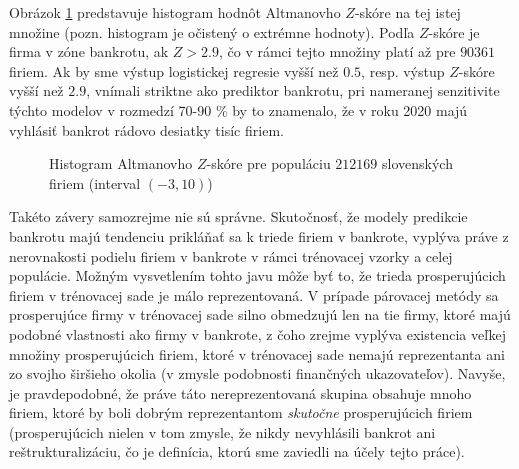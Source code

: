 Obrázok \ref{altman_whole_pop} predstavuje histogram hodnôt Altmanovho \(Z\)-skóre na tej istej množine (pozn. histogram je očistený o extrémne hodnoty).
Podľa \(Z\)-skóre je firma v zóne bankrotu, ak \(Z > 2.9\), čo v rámci tejto množiny platí až pre \(90361\) firiem.
Ak by sme výstup logistickej regresie vyšší než \(0.5\), resp. výstup \(Z\)-skóre vyšší než \(2.9\), vnímali striktne ako prediktor bankrotu,
pri nameranej senzitivite týchto modelov v rozmedzí 70-90 \% by to znamenalo, že v roku 2020 majú vyhlásiť bankrot rádovo desiatky tisíc firiem.

\begin{figure}
\caption{Histogram Altmanovho \(Z\)-skóre pre populáciu \(212169\) slovenských firiem (interval \((-3, 10)\))}
\label{altman_whole_pop}
\end{figure}

Takéto závery samozrejme nie sú správne. Skutočnosť, že modely predikcie bankrotu majú tendenciu prikláňať sa k triede firiem v bankrote,
vyplýva práve z nerovnakosti podielu firiem v bankrote v rámci trénovacej vzorky a celej populácie.
Možným vysvetlením tohto javu môže byť to, že trieda prosperujúcich firiem v trénovacej sade je málo reprezentovaná.
V prípade párovacej metódy sa prosperujúce firmy v trénovacej sade silno obmedzujú len na tie firmy, ktoré majú podobné vlastnosti ako firmy v bankrote,
z čoho zrejme vyplýva existencia veľkej množiny prosperujúcich firiem, ktoré v trénovacej sade nemajú reprezentanta ani zo svojho širšieho okolia (v zmysle podobnosti finančných ukazovateľov).
Navyše, je pravdepodobné, že práve táto nereprezentovaná skupina obsahuje mnoho firiem, ktoré by boli dobrým reprezentantom \emph{skutočne} prosperujúcich firiem
(prosperujúcich nielen v tom zmysle, že nikdy nevyhlásili bankrot ani reštrukturalizáciu, čo je definícia, ktorú sme zaviedli na účely tejto práce).

